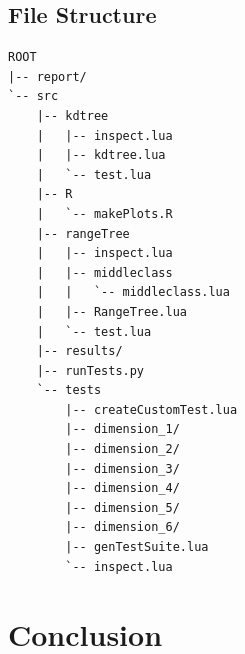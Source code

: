 \documentclass{article}
\begin{document}
\subsection{File Structure}
\begin{verbatim}
ROOT
|-- report/
`-- src
    |-- kdtree
    |   |-- inspect.lua
    |   |-- kdtree.lua
    |   `-- test.lua
    |-- R
    |   `-- makePlots.R
    |-- rangeTree
    |   |-- inspect.lua
    |   |-- middleclass
    |   |   `-- middleclass.lua
    |   |-- RangeTree.lua
    |   `-- test.lua
    |-- results/
    |-- runTests.py
    `-- tests
        |-- createCustomTest.lua
        |-- dimension_1/
        |-- dimension_2/
        |-- dimension_3/
        |-- dimension_4/
        |-- dimension_5/
        |-- dimension_6/
        |-- genTestSuite.lua
        `-- inspect.lua
\end{verbatim}

\section{Conclusion}
\end{document}
